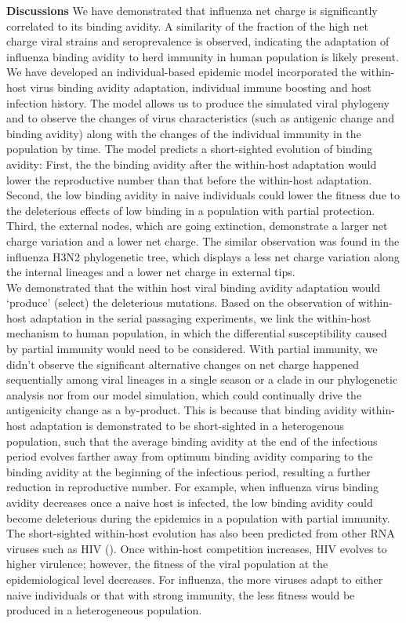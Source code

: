 \documentclass[12pt,a4paper]{article}
\begin{document}



{\bf Discussions}
We have demonstrated that influenza net charge is significantly correlated to its binding avidity. A similarity of the fraction of the high net charge viral strains and seroprevalence is observed, indicating the adaptation of influenza binding avidity to herd immunity in human population is likely present. We have developed an individual-based epidemic model incorporated the within-host virus binding avidity adaptation, individual immune boosting and host infection history. The model allows us to produce the simulated viral phylogeny and to observe the changes of virus characteristics (such as antigenic change and binding avidity) along with the changes of the individual immunity in the population by time. The model predicts a short-sighted evolution of binding avidity: First, the the binding avidity after the within-host adaptation would lower the reproductive number than that before the within-host adaptation. Second, the low binding avidity in naive individuals could lower the fitness due to the deleterious effects of low binding in a population with partial protection. Third, the external nodes, which are going extinction, demonstrate a larger net charge variation and a lower net charge. The similar observation was found in the influenza H3N2 phylogenetic tree, which displays a less net charge variation along the internal lineages and a lower net charge in external tips. \\
We demonstrated that the within host viral binding avidity adaptation would ‘produce’ (select) the deleterious mutations. Based on the observation of within-host adaptation in the serial passaging experiments,  we link the within-host mechanism to human population, in which the differential susceptibility caused by partial immunity would need to be considered. With partial immunity, we didn’t observe the significant alternative changes on net charge happened sequentially among viral lineages in a single season or a clade in our phylogenetic analysis nor from our model simulation, which could continually drive the antigenicity change as a by-product. This is because that binding avidity within-host adaptation is demonstrated to be short-sighted in a heterogenous population, such that the average binding avidity at the end of the infectious period evolves farther away from optimum binding avidity comparing to the binding avidity at the beginning of the infectious period, resulting a further reduction in reproductive number. For example, when influenza virus binding avidity decreases once a naive host is infected, the low binding avidity could become deleterious during the epidemics in a population with partial immunity. The short-sighted within-host evolution has also been predicted from other RNA viruses such as HIV (\cite{Lythgoe2013}). Once within-host competition increases, HIV evolves to higher virulence; however, the fitness of the viral population at the epidemiological level decreases. For influenza, the more viruses adapt to either naive individuals or that with strong immunity, the less fitness would be produced in a  heterogeneous population. \\
\end{document}
